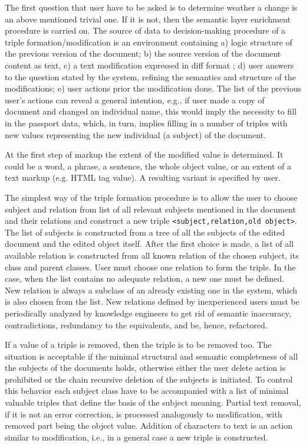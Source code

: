 \documentclass[conference]{IEEEtran}
\begin{document}
The first question that user have to be asked is to determine weather
a change is an above mentioned trivial one.  If it is not, then the
semantic layer enrichment procedure is carried on.  The source of data
to decision-making procedure of a triple formation/modification is an
environment containing a) logic structure of the previous version of
the document; b) the source version of the document content as text,
c) a text modification expressed in diff format \cite{diff}; d) user
answers to the question stated by the system, refining the semantics
and structure of the modifications; e) user actions prior the
modification done.  The list of the previous user's actions can reveal
a general intention, e.g., if user made a copy of document and changed
an individual name, this would imply the necessity to fill in the
passport data, which, in turn, implies filling in a number of triples
with new values representing the new individual (a subject) of the
document.

At the first step of markup the extent of the modified value is
determined.  It could be a word, a phrase, a sentence, the whole
object value, or an extent of a text markup (e.g. HTML tag value).
A resulting variant is specified by user.

The simplest way of the triple formation procedure is to allow the
user to choose subject and relation from list of all relevant subjects
mentioned in the document and their relations and construct a new
triple \texttt{<subject,relation,old object>}.  The list of subjects
is constructed from a tree of all the subjects of the edited document
and the edited object itself.  After the first choice is made, a list
of all available relation is constructed from all known relation of
the chosen subject, its class and parent classes.  User must choose
one relation to form the triple.  In the case, when the list contains
no adequate relation, a new one must be defined.  New relation is
always a subclass of an already existing one in the system, which is
also chosen from the list.  New relations defined by inexperienced
users must be periodically analyzed by knowledge engineers to get rid
of semantic inaccuracy, contradictions, redundancy to the equivalents,
and be, hence, refactored.

If a value of a triple is removed, then the triple is to be removed
too.  The situation is acceptable if the minimal structural and
semantic completeness of all the subjects of the documents holds,
otherwise either the user delete action is prohibited or the chain
recursive deletion of the subjects is initiated.  To control this
behavior each subject class have to be accompanied with a list of
minimal valuable triples that define the basis of the subject meaning.
Partial text removal, if it is not an error correction, is processed
analogously to modification, with removed part being the object value.
Addition of characters to text is an action similar to modification,
i.e., in a general case a new triple is constructed.
\end{document}
